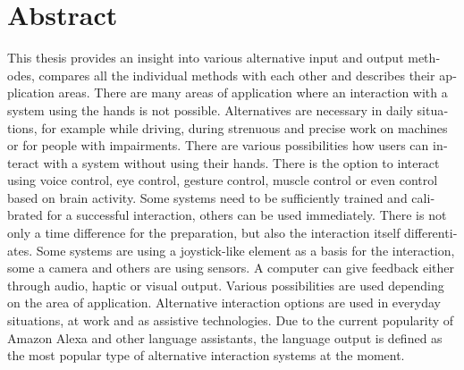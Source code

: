 \chapter{Abstract}

\begin{english} %
%
This thesis provides an insight into various alternative input and output methodes, compares all the individual methods with each other and describes their application areas.
\newline \newline
There are many areas of application where an interaction with a system using the hands is not possible. Alternatives are necessary in daily situations, for example while driving, during strenuous and precise work on machines or for people with impairments.
\newline \newline
There are various possibilities how users can interact with a system without using their hands. There is the option to interact using voice control, eye control, gesture control, muscle control or even control based on brain activity. Some systems need to be sufficiently trained and calibrated for a successful interaction, others can be used immediately. There is not only a time difference for the preparation, but also the interaction itself differentiates. Some systems are using a joystick-like element as a basis for the interaction, some a camera and others are using sensors. 
\newline \newline
A computer can give feedback either through audio, haptic or visual output. Various possibilities are used depending on the area of application.
\newline \newline
Alternative interaction options are used in everyday situations, at work and as assistive technologies. Due to the current popularity of Amazon Alexa and other language assistants, the language output is defined as the most popular type of alternative interaction systems at the moment.
%
\end{english}


